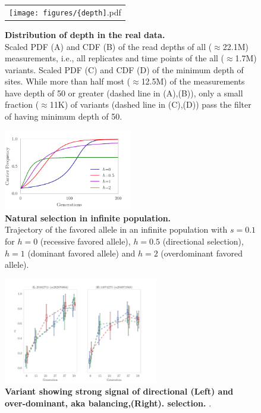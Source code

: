 \begin{figure}[H]
	\centering
	\begin{tabular}{c}
		\texttt{[image: figures/\{depth]}.pdf}
	\end{tabular}
	\caption{ {\bf Distribution of depth in the real data.}\\
		Scaled PDF (A) and CDF (B) of the read depths of all ($\approx$22.1M) 
		measurements, i.e., all replicates and time points of the all 
		($\approx$1.7M) variants.
		Scaled PDF (C) and CDF (D) of the minimum depth of sites. While more 
		than half 
		most ($\approx$12.5M) of the measurements have depth of 50 or greater 
		(dashed line in (A),(B)), only a small fraction ($\approx$11K) of 
		variants (dashed line in (C),(D)) pass the filter of having minimum 
		depth of 50.}  
	\label{fig:depth}
\end{figure}


\begin{figure}[H]
	\centering
	\includegraphics[width=0.5\textwidth]{figures/dominance.pdf}
	\caption{{\bf Natural selection in infinite population.}\\ Trajectory of 
		the 
		favored allele in an infinite population with $s=0.1$ for $h=0$ 
		(recessive 
		favored allele), $h=0.5$ (directional selection), $h=1$ (dominant 
		favored 
		allele) and $h=2$ (overdominant favored allele). }
	\label{fig:dominance}
\end{figure}


\begin{figure}[H]
	\centering
	\includegraphics[trim=0.1in 0 .08in 0.02in , 
	clip,width=0.6\textwidth]{figures/topSNPs.pdf}
	\caption{ {\bf Variant showing strong signal of directional (Left) and 
			over-dominant, 	aka balancing,(Right). 
			selection.}  . }
	\label{fig:dir-bal}
\end{figure}





